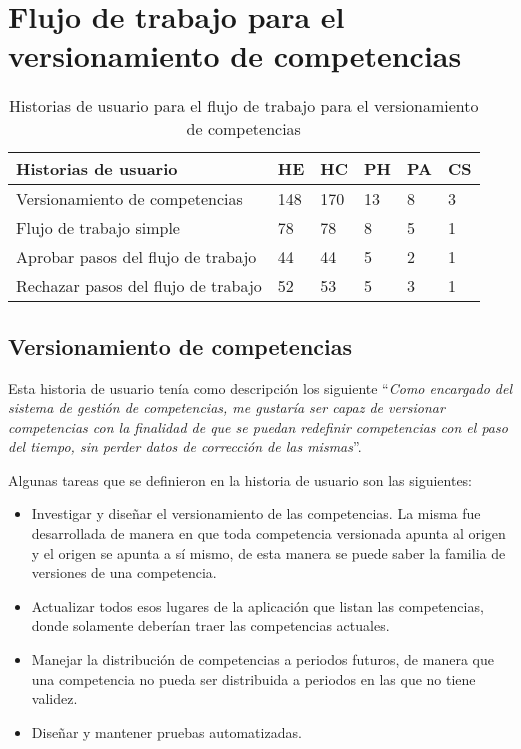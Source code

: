 \section{Flujo de trabajo para el versionamiento de competencias}

\begin{table}[]
\centering
\caption{Historias de usuario para el flujo de trabajo para el versionamiento de competencias}
\label{epic:3}
\begin{tabular}{@{}llllll@{}}
\toprule
Historias de usuario                & HE                   & HC                   & PH                   & PA                   & CS                   \\ \midrule
Versionamiento de competencias      & 148 & 170 & 13 & 8 & 3 \\ 
Flujo de trabajo simple             & 78 & 78 & 8 & 5 & 1 \\
Aprobar pasos del flujo de trabajo  & 44 & 44 & 5 & 2 & 1 \\
Rechazar pasos del flujo de trabajo & 52 & 53 & 5 & 3 & 1 \\ \bottomrule
\end{tabular}
\end{table}

\subsection{Versionamiento de competencias}
Esta historia de usuario tenía como descripción los siguiente \enquote{\textit{Como encargado del sistema de gestión de competencias, me gustaría ser capaz de versionar competencias con la finalidad de que se puedan redefinir competencias con el paso del tiempo, sin perder datos de corrección de las mismas}}.

Algunas tareas que se definieron en la historia de usuario son las siguientes:
\begin{itemize}
	\item Investigar y diseñar el versionamiento de las competencias. La misma fue desarrollada de manera en que toda competencia versionada apunta al origen y el origen se apunta a sí mismo, de esta manera se puede saber la familia de versiones de una competencia.
	\item Actualizar todos esos lugares de la aplicación que listan las competencias, donde solamente deberían traer las competencias actuales.
	\item Manejar la distribución de competencias a periodos futuros, de manera que una competencia no pueda ser distribuida a periodos en las que no tiene validez.
	\item Diseñar y mantener pruebas automatizadas.
\end{itemize}

